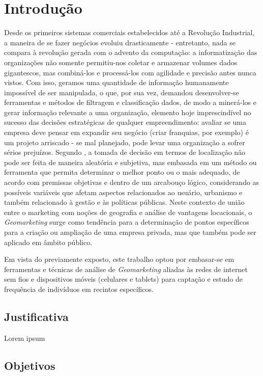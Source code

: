 
\chapter{Introdução}
\label{introducao}

Desde os primeiros sistemas comerciais estabelecidos até a Revolução Industrial, a maneira de se fazer negócios evoluiu drasticamente - entretanto, nada se compara à revolução gerada com o advento da computação: a informatização das organizações não somente permitiu-nos coletar e armazenar volumes dados gigantescos, mas combiná-los e processá-los com agilidade e precisão antes nunca vistos. Com isso, geramos uma quantidade de informação humanamente impossível de ser manipulada, o que, por sua vez, demandou desenvolver-se ferramentas e métodos de filtragem e classificação dados, de modo a minerá-los e gerar informação relevante a uma organização, elemento hoje imprescindível no sucesso das decisões estratégicas de qualquer empreendimento: avaliar se uma empresa deve pensar em expandir seu negócio (criar franquias, por exemplo) é um projeto arriscado - se mal planejado, pode levar uma organização a sofrer sérios prejuízos. Segundo , a tomada de decisão em termos de localização não pode ser feita de maneira aleatória e subjetiva, mas embasada em um método ou ferramenta que permita
determinar o melhor ponto ou o mais adequado, de acordo com premissas objetivas e dentro
de um arcabouço lógico, considerando as possíveis variáveis que afetam aspectos
relacionados ao usuário, urbanismo e também relacionado à gestão e às políticas públicas. Neste contexto de união entre o marketing com noções de geografia e análise de vantagens
locacionais, o \emph{Geomarketing} surge como tendência para a determinação de pontos específicos
para a criação ou ampliação de uma empresa privada, mas que também pode ser aplicado em âmbito público. 

Em vista do previamente exposto, este trabalho optou por embasar-se em ferramentas e técnicas de análise de \emph{Geomarketing} aliadas às redes de internet sem fios e dispositivos móveis (celulares e tablets) para captação e estudo de frequência de indivíduos em recintos específicos.

\section{Justificativa}
\label{justificativa}

Lorem ipsum

\section{Objetivos}
\label{objetivos}

